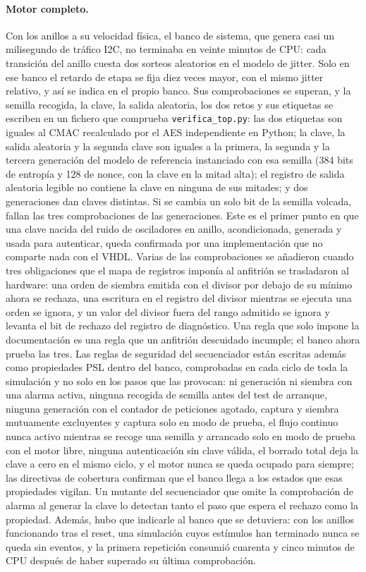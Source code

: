 \paragraph{Motor completo.} Con los anillos a su velocidad física, el
banco de sistema, que genera casi un milisegundo de tráfico I2C, no
terminaba en veinte minutos de CPU: cada transición del anillo cuesta
dos sorteos aleatorios en el modelo de jitter. Solo en ese banco el
retardo de etapa se fija diez veces mayor, con el mismo jitter relativo,
y así se indica en el propio banco. Sus comprobaciones se
superan, y la semilla recogida, la clave, la salida aleatoria, los dos
retos y sus etiquetas se escriben en un fichero que comprueba
\texttt{verifica\_top.py}: las dos etiquetas son iguales al CMAC
recalculado por el AES independiente en Python; la clave, la salida
aleatoria y la segunda clave son iguales a la primera, la segunda y la
tercera generación del modelo de referencia instanciado con esa semilla
(384 bits de entropía y 128 de nonce, con la clave en la mitad alta); el
registro de salida aleatoria legible no contiene la clave en ninguna de
sus mitades; y dos generaciones dan claves distintas. Si se cambia un
solo bit de la semilla volcada, fallan las tres comprobaciones de las
generaciones. Este es el primer
punto en que una clave nacida del ruido de osciladores en anillo,
acondicionada, generada y usada para autenticar, queda confirmada por
una implementación que no comparte nada con el VHDL.
Varias de las comprobaciones se añadieron cuando tres obligaciones
que el mapa de registros imponía al anfitrión se trasladaron al
hardware: una orden de siembra emitida con el divisor por debajo de su
mínimo ahora se rechaza, una escritura en el registro del divisor
mientras se ejecuta una orden se ignora, y un valor del divisor fuera
del rango admitido se ignora y levanta el bit de rechazo del registro de
diagnóstico. Una regla que solo impone la
documentación es una regla que un anfitrión descuidado incumple; el
banco ahora prueba las tres. Las reglas de seguridad del secuenciador
están escritas además como propiedades PSL dentro del banco, comprobadas
en cada ciclo de toda la simulación y no solo en los pasos que las
provocan: ni generación ni siembra con una alarma activa, ninguna
recogida de semilla antes del test de arranque, ninguna generación con
el contador de peticiones agotado, captura y siembra mutuamente
excluyentes y captura solo en modo de prueba, el flujo continuo nunca
activo mientras se recoge una semilla y arrancado solo en modo de prueba
con el motor libre, ninguna autenticación sin
clave válida, el borrado total deja la clave a cero en el mismo ciclo, y
el motor nunca se queda ocupado para siempre; las directivas de
cobertura confirman que el banco llega a los estados que esas
propiedades vigilan. Un mutante del secuenciador que omite la
comprobación de alarma al generar la clave lo detectan tanto el paso que
espera el rechazo como la propiedad. Además, hubo que indicarle al banco
que se detuviera: con los anillos funcionando tras el reset, una simulación
cuyos estímulos han terminado nunca se queda sin eventos, y la primera
repetición consumió cuarenta y cinco minutos de CPU después de haber
superado su última comprobación.

